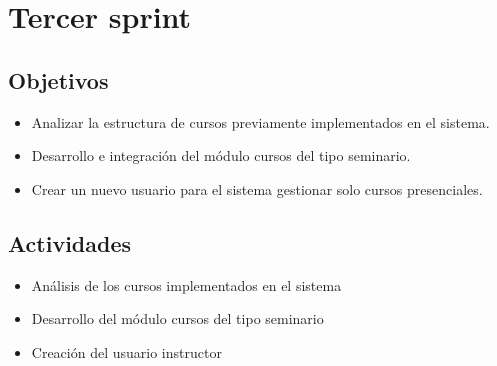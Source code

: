 \section{Tercer sprint} %
\label{sec:tercer_sprint}

\subsection{Objetivos}

\begin{itemize}
	\item Analizar la estructura de cursos previamente implementados en el sistema.
	\item Desarrollo e integración del módulo cursos del tipo seminario.
	\item Crear un nuevo usuario para el sistema gestionar solo cursos presenciales.
\end{itemize}

\subsection{Actividades} %
\label{sub:actividades3}

\begin{itemize}

\item Análisis de los cursos implementados en el sistema
\item Desarrollo del módulo cursos del tipo seminario
\item Creación del usuario instructor

\end{itemize}



